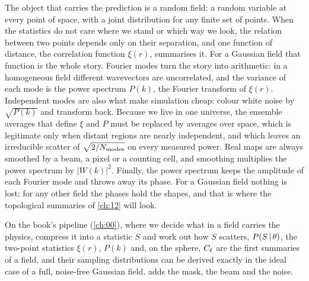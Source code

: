 The object that carries the prediction is a random field: a random variable at
every point of space, with a joint distribution for any finite set of points.
When the statistics do not care where we stand or which way we look, the
relation between two points depends only on their separation, and one function
of distance, the correlation function $\xi(r)$, summarises it. For a Gaussian
field that function is the whole story. Fourier modes turn the story into
arithmetic: in a homogeneous field different wavevectors are uncorrelated, and
the variance of each mode is the power spectrum $P(k)$, the Fourier transform
of $\xi(r)$. Independent modes are also what make simulation cheap: colour white
noise by $\sqrt{P(k)}$ and transform back. Because we live in one universe, the
ensemble averages that define $\xi$ and $P$ must be replaced by averages over
space, which is legitimate only when distant regions are nearly independent, and
which leaves an irreducible scatter of $\sqrt{2/N_{\rm modes}}$ on every
measured power. Real maps are always smoothed by a beam, a pixel or a counting
cell, and smoothing multiplies the power spectrum by $|W(k)|^2$. Finally, the
power spectrum keeps the amplitude of each Fourier mode and throws away its
phase. For a Gaussian field nothing is lost; for any other field the phases hold
the shapes, and that is where the topological summaries of \cref{ch:12} will
look.

On the book's pipeline (\cref{ch:00}), where we decide what in a field carries
the physics, compress it into a statistic $S$ and work out how $S$ scatters,
$P(S\,\vert\,\theta)$, the two-point statistics $\xi(r)$, $P(k)$ and, on the sphere,
$C_\ell$ are the first summaries of a field, and their sampling distributions can
be derived exactly in the ideal case of a full, noise-free Gaussian field.  adds the mask, the beam and the noise.

